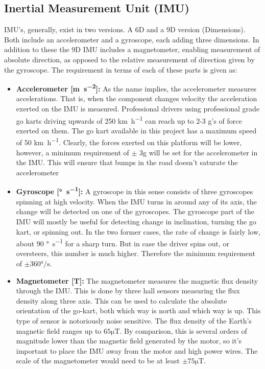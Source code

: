 \subsection{Inertial Measurement Unit (IMU)}
\label{sec:imu}
IMU's, generally, exist in two versions.
A 6D and a 9D version (Dimensions).
Both include an accelerometer and a gyroscope, each adding three dimensions.
In addition to these the 9D IMU includes a magnetometer, enabling measurement of absolute direction, as opposed to the relative measurement of direction given by the gyroscope.
The requirement in terms of each of these parts is given as:
\begin{itemize}
	\item \textbf{Accelerometer [\si{\metre\per\second^2}]:} As the name implies, the accelerometer measures accelerations.
	That is, when the component changes velocity the acceleration exerted on the IMU is measured.
	Professional drivers using professional grade go karts driving upwards of 250 \si{\kilo\metre\per\hour} can reach up to 2-3 g's of force exerted on them.
	The go kart available in this project has a maximum speed of 50 \si{\kilo\metre\per\hour}.
	Clearly, the forces exerted on this platform will be lower, however, a minimum requirement of $\pm$ 3g will be set for the accelerometer in the IMU.
	This will ensure that bumps in the road doesn't saturate the accelerometer
	\item \textbf{Gyroscope [\si{\degree\per\second}]:} 
	A gyroscope in this sense consists of three gyroscopes spinning at high velocity.
	When the IMU turns in around any of its axis, the change will be detected on one of the gyroscopes. 
	The gyroscope part of the IMU will mostly be useful for detecting change in inclination, turning the go kart, or spinning out.
	In the two former cases, the rate of change is fairly low, about 90 \si{\degree\per\second} for a sharp turn. 
	But in case the driver spins out, or oversteers, this number is much higher. 
	Therefore the minimum requirement of $\pm 360 \si{\degree\per\second}$.
	\item \textbf{Magnetometer [\si{\tesla}]:} 
	The magnetometer measures the magnetic flux density through the IMU.
	This is done by three hall sensors measuring the flux density along three axis. 
	This can be used to calculate the absolute orientation of the go-kart, both which way is north and which way is up.
	This type of sensor is notoriously noise sensitive.
	The flux density of the Earth's magnetic field ranges up to $65 \si{\micro\tesla}$.
	By comparison, this is several orders of magnitude lower than the magnetic field generated by the motor, so it's important to place the IMU away from the motor and high power wires.
	The scale of the magnetometer would need to be at least $\pm 75 \si{\micro \tesla}$.
\end{itemize}
